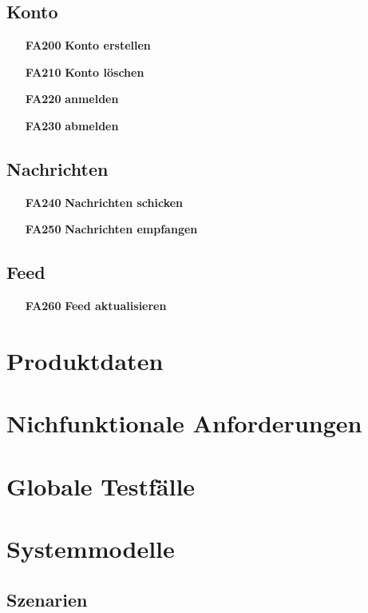 \documentclass[parskip=full]{scrartcl}
\begin{document}
	\subsection{Konto}
	\begin{itemize}[nosep]
		\item[\textbf{FA200}]\textbf{Konto erstellen}
		\item[\textbf{FA210}]\textbf{Konto löschen}
		\item[\textbf{FA220}]\textbf{anmelden}
		\item[\textbf{FA230}]\textbf{abmelden}
	\end{itemize}

	\subsection{Nachrichten}
	\begin{itemize}[nosep]
		\item[\textbf{FA240}]\textbf{Nachrichten schicken}
		\item[\textbf{FA250}]\textbf{ Nachrichten empfangen}
	\end{itemize}

	\subsection{Feed}
	\begin{itemize}[nosep]
		\item[\textbf{FA260}]\textbf{Feed aktualisieren}
	\end{itemize}
	\section{Produktdaten}

	\section{Nichfunktionale Anforderungen}

	\section{Globale Testfälle}

	\section{Systemmodelle}
	\subsection{Szenarien}
\end{document}
